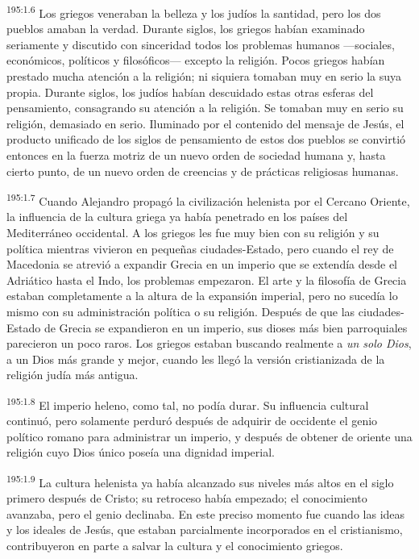 \par 
\textsuperscript{195:1.6} Los griegos veneraban la belleza y los judíos la santidad, pero los dos pueblos amaban la verdad. Durante siglos, los griegos habían examinado seriamente y discutido con sinceridad todos los problemas humanos ---sociales, económicos, políticos y filosóficos--- excepto la religión. Pocos griegos habían prestado mucha atención a la religión; ni siquiera tomaban muy en serio la suya propia. Durante siglos, los judíos habían descuidado estas otras esferas del pensamiento, consagrando su atención a la religión. Se tomaban muy en serio su religión, demasiado en serio. Iluminado por el contenido del mensaje de Jesús, el producto unificado de los siglos de pensamiento de estos dos pueblos se convirtió entonces en la fuerza motriz de un nuevo orden de sociedad humana y, hasta cierto punto, de un nuevo orden de creencias y de prácticas religiosas humanas.

\par 
\textsuperscript{195:1.7} Cuando Alejandro propagó la civilización helenista por el Cercano Oriente, la influencia de la cultura griega ya había penetrado en los países del Mediterráneo occidental. A los griegos les fue muy bien con su religión y su política mientras vivieron en pequeñas ciudades-Estado, pero cuando el rey de Macedonia se atrevió a expandir Grecia en un imperio que se extendía desde el Adriático hasta el Indo, los problemas empezaron. El arte y la filosofía de Grecia estaban completamente a la altura de la expansión imperial, pero no sucedía lo mismo con su administración política o su religión. Después de que las ciudades-Estado de Grecia se expandieron en un imperio, sus dioses más bien parroquiales parecieron un poco raros. Los griegos estaban buscando realmente a \textit{un solo Dios}, a un Dios más grande y mejor, cuando les llegó la versión cristianizada de la religión judía más antigua.

\par 
\textsuperscript{195:1.8} El imperio heleno, como tal, no podía durar. Su influencia cultural continuó, pero solamente perduró después de adquirir de occidente el genio político romano para administrar un imperio, y después de obtener de oriente una religión cuyo Dios único poseía una dignidad imperial.

\par 
\textsuperscript{195:1.9} La cultura helenista ya había alcanzado sus niveles más altos en el siglo primero después de Cristo; su retroceso había empezado; el conocimiento avanzaba, pero el genio declinaba. En este preciso momento fue cuando las ideas y los ideales de Jesús, que estaban parcialmente incorporados en el cristianismo, contribuyeron en parte a salvar la cultura y el conocimiento griegos.

